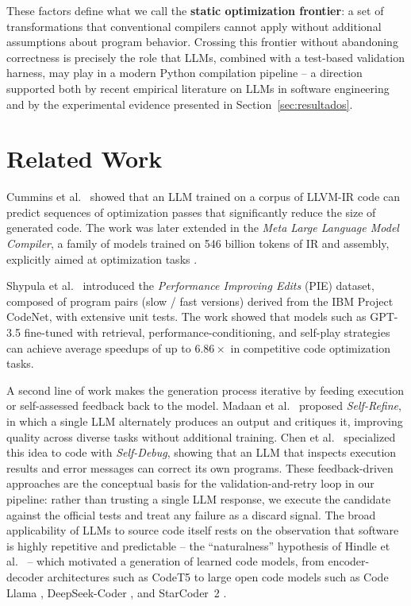 \documentclass[conference]{IEEEtran}
\begin{document}
These factors define what we call the \textbf{static optimization frontier}: a set of transformations that conventional compilers cannot apply without additional assumptions about program behavior. Crossing this frontier without abandoning correctness is precisely the role that LLMs, combined with a test-based validation harness, may play in a modern Python compilation pipeline -- a direction supported both by recent empirical literature on LLMs in software engineering \cite{DBLP:conf/icse/FanGHLSYZ24,DBLP:journals/tosem/HouZLYWLLLGW24} and by the experimental evidence presented in Section~\ref{sec:resultados}.

\section{Related Work}
\label{sec:relacionados}

Cummins et al.~\cite{DBLP:journals/corr/abs-2309-07062} showed that an LLM trained on a corpus of LLVM-IR code can predict sequences of optimization passes that significantly reduce the size of generated code. The work was later extended in the \textit{Meta Large Language Model Compiler}, a family of models trained on 546 billion tokens of IR and assembly, explicitly aimed at optimization tasks \cite{DBLP:journals/corr/abs-2407-02524}.

Shypula et al.~\cite{DBLP:journals/corr/abs-2302-07867} introduced the \textit{Performance Improving Edits} (PIE) dataset, composed of program pairs (slow / fast versions) derived from the IBM Project CodeNet, with extensive unit tests. The work showed that models such as GPT-3.5 fine-tuned with retrieval, performance-conditioning, and self-play strategies can achieve average speedups of up to $6.86\times$ in competitive code optimization tasks.

A second line of work makes the generation process iterative by feeding execution or self-assessed feedback back to the model. Madaan et al.~\cite{DBLP:journals/corr/abs-2303-17651} proposed \textit{Self-Refine}, in which a single LLM alternately produces an output and critiques it, improving quality across diverse tasks without additional training. Chen et al.~\cite{DBLP:journals/corr/abs-2304-05128} specialized this idea to code with \textit{Self-Debug}, showing that an LLM that inspects execution results and error messages can correct its own programs. These feedback-driven approaches are the conceptual basis for the validation-and-retry loop in our pipeline: rather than trusting a single LLM response, we execute the candidate against the official tests and treat any failure as a discard signal. The broad applicability of LLMs to source code itself rests on the observation that software is highly repetitive and predictable -- the ``naturalness'' hypothesis of Hindle et al.~\cite{DBLP:conf/icse/HindleBSGD12} -- which motivated a generation of learned code models, from encoder-decoder architectures such as CodeT5 \cite{DBLP:journals/corr/abs-2109-00859} to large open code models such as Code Llama \cite{DBLP:journals/corr/abs-2308-12950}, DeepSeek-Coder \cite{DBLP:journals/corr/abs-2401-14196}, and StarCoder~2 \cite{DBLP:journals/corr/abs-2402-19173}.
\end{document}
